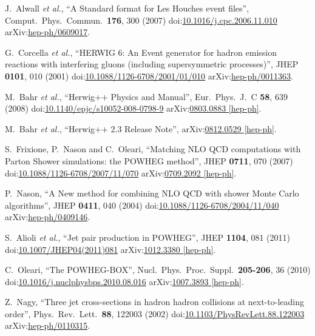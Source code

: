 \begin{thebibliography}{99}
J.~Alwall {\it et al.}, ``A Standard format for Les Houches event files'', Comput.\ Phys.\ Commun.\ {\bf 176}, 300 (2007) doi:\href{http://dx.doi.org/10.1016/j.cpc.2006.11.010}{10.1016/j.cpc.2006.11.010} arXiv:\href{https://arxiv.org/abs/hep-ph/0609017}{hep-ph/0609017}.
 
G.~Corcella {\it et al.}, ``HERWIG 6: An Event generator for hadron emission reactions with interfering gluons (including supersymmetric processes)'', JHEP {\bf 0101}, 010 (2001) doi:\href{http://dx.doi.org/10.1088/1126-6708/2001/01/010}{10.1088/1126-6708/2001/01/010} arXiv:\href{https://arxiv.org/abs/hep-ph/0011363}{hep-ph/0011363}. 
 
M.~Bahr {\it et al.}, ``Herwig++ Physics and Manual'', Eur.\ Phys.\ J.\ C {\bf 58}, 639 (2008) doi:\href{http://dx.doi.org/10.1140/epjc/s10052-008-0798-9}{10.1140/epjc/s10052-008-0798-9} arXiv:\href{https://arxiv.org/abs/0803.0883}{0803.0883 [hep-ph]}.

M.~Bahr {\it et al.}, ``Herwig++ 2.3 Release Note'', arXiv:\href{https://arxiv.org/abs/0812.0529}{0812.0529 [hep-ph]}.

S.~Frixione, P.~Nason and C.~Oleari, ``Matching NLO QCD computations with Parton Shower simulations: the POWHEG method'', JHEP {\bf 0711}, 070 (2007) doi:\href{http://dx.doi.org/10.1088/1126-6708/2007/11/070}{10.1088/1126-6708/2007/11/070} arXiv:\href{https://arxiv.org/abs/0709.2092}{0709.2092 [hep-ph]}.

P.~Nason, ``A New method for combining NLO QCD with shower Monte Carlo algorithms'', JHEP {\bf 0411}, 040 (2004) doi:\href{http://dx.doi.org/10.1088/1126-6708/2004/11/040}{10.1088/1126-6708/2004/11/040} arXiv:\href{https://arxiv.org/abs/hep-ph/0409146}{hep-ph/0409146}.

S.~Alioli {\it et al.}, ``Jet pair production in POWHEG'', JHEP {\bf 1104}, 081 (2011) doi:\href{http://dx.doi.org/10.1007/JHEP04(2011)081}{10.1007/JHEP04(2011)081} arXiv:\href{https://arxiv.org/abs/1012.3380}{1012.3380 [hep-ph]}.

C.~Oleari, ``The POWHEG-BOX'', Nucl.\ Phys.\ Proc.\ Suppl.\ {\bf 205-206}, 36 (2010) doi:\href{http://dx.doi.org/10.1016/j.nuclphysbps.2010.08.016}{10.1016/j.nuclphysbps.2010.08.016} arXiv:\href{https://arxiv.org/abs/1007.3893}{1007.3893 [hep-ph]}.

Z.~Nagy, ``Three jet cross-sections in hadron hadron collisions at next-to-leading order'', Phys.\ Rev.\ Lett.\ {\bf 88}, 122003 (2002) doi:\href{http://dx.doi.org/10.1103/PhysRevLett.88.122003}{10.1103/PhysRevLett.88.122003} arXiv:\href{https://arxiv.org/abs/hep-ph/0110315}{hep-ph/0110315}.


\end{thebibliography}
